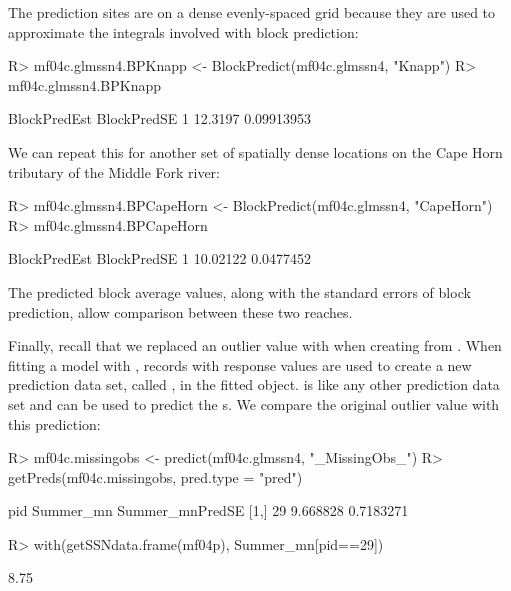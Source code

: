 \documentclass[nojss]{jss}
\renewenvironment{Schunk}{\vspace{\topsep}}{\vspace{\topsep}}
\begin{document}
The prediction sites are on a dense evenly-spaced grid because they
are used to approximate the integrals involved with block prediction:
\begin{Schunk}
\begin{Sinput}
R> mf04c.glmssn4.BPKnapp <- BlockPredict(mf04c.glmssn4, "Knapp")
R> mf04c.glmssn4.BPKnapp
\end{Sinput}
\begin{Soutput}
  BlockPredEst BlockPredSE
1      12.3197  0.09913953
\end{Soutput}
\end{Schunk}
We can repeat this for another set of spatially dense locations on the
Cape Horn tributary of the Middle Fork river:
\begin{Schunk}
\begin{Sinput}
R> mf04c.glmssn4.BPCapeHorn <- BlockPredict(mf04c.glmssn4, "CapeHorn")
R> mf04c.glmssn4.BPCapeHorn
\end{Sinput}
\begin{Soutput}
  BlockPredEst BlockPredSE
1     10.02122   0.0477452
\end{Soutput}
\end{Schunk}
The predicted block average values, along with the standard errors of
block prediction, allow comparison between these two reaches.

Finally, recall that we replaced an outlier value with  when
creating  from . When fitting a model with
, records with  response values are used to
create a new prediction data set, called , in the
fitted  object.  is like any other
prediction data set and can be used to predict the s. We
compare the original outlier value with this prediction:

\begin{Schunk}
\begin{Sinput}
R> mf04c.missingobs <- predict(mf04c.glmssn4, "_MissingObs_")
R> getPreds(mf04c.missingobs, pred.type = "pred")
\end{Sinput}
\begin{Soutput}
     pid Summer_mn Summer_mnPredSE
[1,]  29  9.668828       0.7183271
\end{Soutput}
\begin{Sinput}
R> with(getSSNdata.frame(mf04p), Summer_mn[pid==29])
\end{Sinput}
\begin{Soutput}
[1] 8.75
\end{Soutput}
\end{Schunk}
\end{document}
